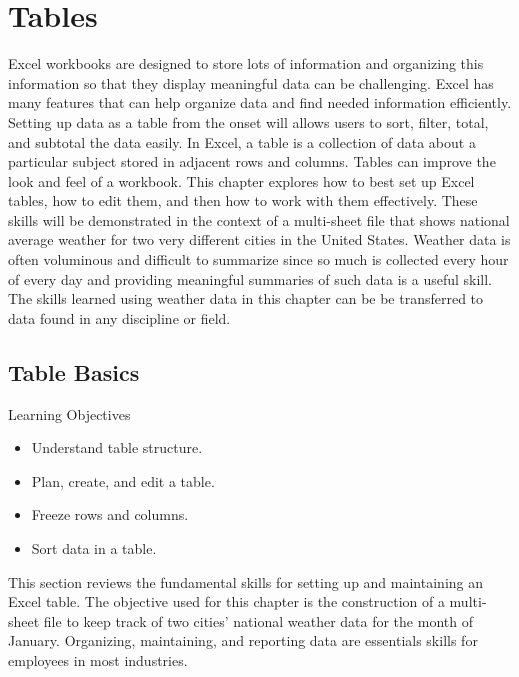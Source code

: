 \chapter{Tables}\label{ch05:tables}

Excel workbooks are designed to store lots of information and organizing this information so that they display meaningful data can be challenging. Excel has many features that can help organize data and find needed information efficiently. Setting up data as a table from the onset will allows users to sort, filter, total, and subtotal the data easily. In Excel, a table is a collection of data about a particular subject stored in adjacent rows and columns. Tables can improve the look and feel of a workbook. This chapter explores how to best set up Excel tables, how to edit them, and then how to work with them effectively. These skills will be demonstrated in the context of a multi-sheet file that shows national average weather for two very different cities in the United States. Weather data is often voluminous and difficult to summarize since so much is collected every hour of every day and providing meaningful summaries of such data is a useful skill. The skills learned using weather data in this chapter can be be transferred to data found in any discipline or field.

\section{Table Basics}

\begin{center}
	\begin{objbox}{Learning Objectives}
		\begin{itemize}
			\setlength{\itemsep}{0pt}
			\setlength{\parskip}{0pt}
			\setlength{\parsep}{0pt}
			
			\item Understand table structure.
			\item Plan, create, and edit a table.
			\item Freeze rows and columns.
			\item Sort data in a table.
		\end{itemize}
	\end{objbox}
\end{center}

This section reviews the fundamental skills for setting up and maintaining an Excel table. The objective used for this chapter is the construction of a multi-sheet file to keep track of two cities' national weather data for the month of January. Organizing, maintaining, and reporting data are essentials skills for employees in most industries.

